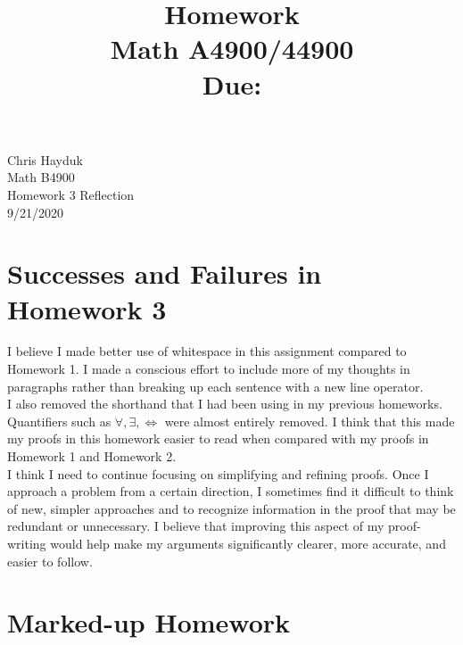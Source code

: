 \documentclass[11pt, reqno]{amsart}
\title[Homework \HW]{Homework \HW \\
Math A4900/44900\\
\small Due: \DUE}
\author{}
\theoremstyle{plain}
\theoremstyle{definition}
\theoremstyle{example}
\def\HW{3 Reflection}
\def\DUE{9/21/2020}
\begin{document}
\begin{flushright}
Chris Hayduk\\
Math B4900\\
Homework \HW\\
\DUE
\end{flushright}

\section{Successes and Failures in Homework 3}

I believe I made better use of whitespace in this assignment compared to Homework 1. I made a conscious effort to include more of my thoughts in paragraphs rather than breaking up each sentence with a new line operator.\\

I also removed the shorthand that I had been using in my previous homeworks. Quantifiers such as $\forall, \exists, \iff$ were almost entirely removed. I think that this made my proofs in this homework easier to read when compared with my proofs in Homework 1 and Homework 2.\\

I think I need to continue focusing on simplifying and refining proofs. Once I approach a problem from a certain direction, I sometimes find it difficult to think of new, simpler approaches and to recognize information in the proof that may be redundant or unnecessary. I believe that improving this aspect of my proof-writing would help make my arguments significantly clearer, more accurate, and easier to follow.

\newpage
\section{Marked-up Homework}
\end{document}
